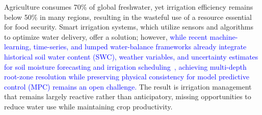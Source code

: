 \documentclass[pdflatex,sn-nature]{sn-jnl}%
\theoremstyle{thmstyleone}%
\theoremstyle{thmstyletwo}%
\theoremstyle{thmstylethree}%
\begin{document}
Agriculture consumes 70\% of global freshwater\cite{scanlon2023}, yet irrigation efficiency remains below 50\% in many regions\cite{Mehta2024}, resulting in the wasteful use of a resource essential for food security. Smart irrigation systems, which utilize sensors and algorithms to optimize water delivery, offer a solution; however, \textcolor{blue}{while recent machine-learning, time-series, and lumped water-balance frameworks already integrate historical soil water content (SWC), weather variables, and uncertainty estimates for soil moisture forecasting and irrigation scheduling~\cite{Zou2010, Murcia2024, Bagheri2025, condeforecast2024}, achieving multi-depth root-zone resolution while preserving physical consistency for model predictive control (MPC) remains an open challenge.} The result is irrigation management that remains largely reactive rather than anticipatory, missing opportunities to reduce water use while maintaining crop productivity.

\end{document}

